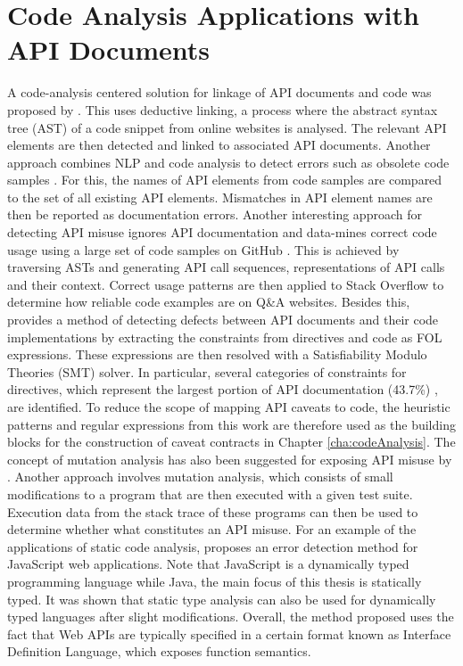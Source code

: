 \section{Code Analysis Applications with API Documents}
\label{sec:related-static-code-analysis}
A code-analysis centered solution for linkage of API documents and code was proposed by \cite{live-api-doc}. This uses deductive linking, a process where the abstract syntax tree (AST) of a code snippet from online websites is analysed. The relevant API elements are then detected and linked to associated API documents. Another approach combines NLP and code analysis to detect errors such as obsolete code samples \cite{zhong2013detecting}. For this, the names of API elements from code samples are compared to the set of all existing API elements. Mismatches in API element names are then be reported as documentation errors. Another interesting approach for detecting API misuse ignores API documentation and data-mines correct code usage using a large set of code samples on GitHub \cite{code-examples}. This is achieved by traversing ASTs and generating API call sequences, representations of API calls and their context. Correct usage patterns are then applied to Stack Overflow to determine how reliable code examples are on Q\&A websites. Besides this, \cite{zhou-directive} provides a method of detecting defects between API documents and their code implementations by extracting the constraints from directives and code as FOL expressions. These expressions are then resolved with a Satisfiability Modulo Theories (SMT) solver. In particular, several categories of constraints for directives, which represent the largest portion of API documentation (43.7\%) \cite{monperrus2012should}, are identified. To reduce the scope of mapping API caveats to code, the heuristic patterns and regular expressions from this work are therefore used as the building blocks for the construction of caveat contracts in Chapter \ref{cha:codeAnalysis}.
The concept of mutation analysis has also been suggested for exposing API misuse by \cite{mutation-analysis}. Another approach involves mutation analysis, which consists of small modifications to a program that are then executed with a given test suite. Execution data from the stack trace of these programs can then be used to determine whether what constitutes an API misuse. For an example of the applications of static code analysis,  \cite{bae2014safewapi} proposes an error detection method for JavaScript web applications. Note that JavaScript is a dynamically typed programming language while Java, the main focus of this thesis is statically typed. It was shown that static type analysis can also be used for dynamically typed languages after slight modifications. Overall, the method proposed uses the fact that Web APIs are typically specified in a certain format known as Interface Definition Language, which exposes function semantics.


